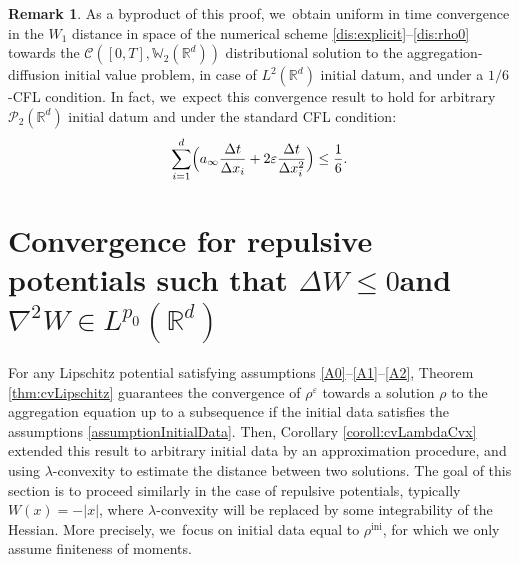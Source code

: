\documentclass[11pt]{article}
\numberwithin{equation}{section}
\newcommand{\ini}{\mathrm{ini}}
\def\RR{\mathbb{R}}
\def\WW{\mathbb{W}}
\def\eps{\varepsilon}
\def\dt{\Delta t}
\def\dx{\Delta x}
\def\calC{{\mathcal C}}
\def\calP{{\mathcal P}}
\theoremstyle{plain}
\theoremstyle{definition}
\newtheorem{remark}[theorem]{Remark}
\begin{document}
\begin{remark}
As a byproduct of this proof, we~obtain uniform in time convergence in the $W_1$ distance in space of the numerical scheme \eqref{dis:explicit}--\eqref{dis:rho0} towards the $\calC([0,T], \WW_2(\RR^d))$ distributional solution to the aggregation-diffusion initial value problem, in case of $L^2(\RR^d)$ initial datum, and under a $1/6$-CFL condition. In fact, we~expect this convergence result to hold for arbitrary $\calP_2(\RR^d)$ initial datum and under the standard CFL condition:
\[
\sum_{i=1}^d \Bigl(a_\infty \frac{\dt}{\dx_i} + 2\eps \frac{\dt}{\dx_i^2}\Bigr) \leq \frac 16.
\]
\end{remark}

\section{Convergence for repulsive potentials such that
\texorpdfstring{$\Delta W \leq 0$\nobreakspace and\nobreakspace $\nabla^2 W \in L^{p_0}(\RR^d)$}{titlesection2}}\label{section:repulsive}

For any Lipschitz potential satisfying assumptions \eqref{A0}--\eqref{A1}--\eqref{A2}, Theorem \ref{thm:cvLipschitz} guarantees the convergence of $\rho^\eps$ towards a solution $\rho$ to the aggregation equation up to a subsequence if the initial data satisfies the assumptions \eqref{assumptionInitialData}. Then, Corollary \ref{coroll:cvLambdaCvx} extended this result to arbitrary initial data by an approximation procedure, and using $\lambda$-convexity to estimate the distance between two solutions. The goal of this section is to proceed similarly in the case of repulsive potentials, typically $W(x) = -|x|$, where $\lambda$-convexity will be replaced by some integrability of the Hessian. More precisely, we~focus on initial data equal to $\rho^{\ini}$, for which we only assume finiteness of moments.
\end{document}
